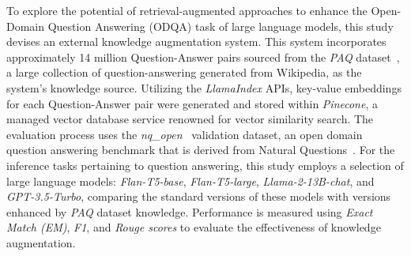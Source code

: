 To explore the potential of retrieval-augmented approaches to enhance the Open-Domain Question Answering (ODQA) task of large language models, this study devises an external knowledge augmentation system. This system incorporates approximately 14 million Question-Answer pairs sourced from the \emph{PAQ} dataset~\citep{paq}, a large collection of question-answering generated from Wikipedia, as the system’s knowledge source. Utilizing the \emph{LlamaIndex} APIs, key-value embeddings for each Question-Answer pair were generated and stored within \emph{Pinecone}, a managed vector database service renowned for vector similarity search. The evaluation process uses the \emph{nq\_open}~\citep{doi:10.1162/tacl-a-00276, lee-etal-2019-latent} validation dataset, an open domain question answering benchmark that is derived from Natural Questions~\citep{lee-etal-2019-latent}. For the inference tasks pertaining to question answering, this study employs a selection of large language models: \emph{Flan-T5-base}, \emph{Flan-T5-large}, \emph{Llama-2-13B-chat}, and \emph{GPT-3.5-Turbo}, comparing the standard versions of these models with versions enhanced by \emph{PAQ} dataset knowledge. Performance is measured using \emph{Exact Match (EM)}, \emph{F1}, and \emph{Rouge scores} to evaluate the effectiveness of knowledge augmentation.
